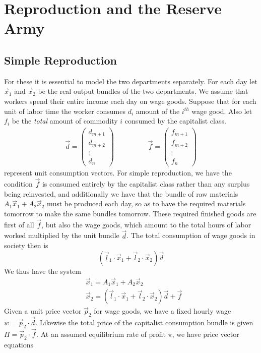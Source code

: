 \section{Reproduction and the Reserve Army}
\subsection{Simple Reproduction}
For these it is essential to model the two departments separately. For each day let $\vec{x}_1$ and $\vec{x}_2$ be the real output bundles of the two departments. We assume that workers spend their entire income each day on wage goods. Suppose that for each unit of labor time the worker consumes $d_i$ amount of the $i^{th}$ wage good. Also let $f_i$ be the \emph{total} amount of commodity $i$ consumed by the capitalist class. 
\begin{align}
	\vec{d} = \begin{pmatrix} d_{m+1} \\ d_{m+2} \\ \vdots \\ d_n \end{pmatrix} \hspace{2cm} \vec{f} = \begin{pmatrix} f_{m+1} \\ f_{m+2} \\ \vdots \\ f_n \end{pmatrix}
\end{align}
represent unit consumption vectors. For simple reproduction, we have the condition $\vec{f}$ is consumed entirely by the capitalist class rather than any surplus being reinvested, and additionally we have that the bundle of raw materials $A_1\vec{x}_1 + A_2\vec{x}_2$ must be produced each day, so as to have the required materials tomorrow to make the same bundles tomorrow. These required finished goods are first of all $\vec{f}$, but also the wage goods, which amount to the total hours of labor worked multiplied by the unit bundle $\vec{d}$. The total consumption of wage goods in society then is 
\[ (\vec{l}_1\cdot \vec{x}_1 + \vec{l}_2 \cdot \vec{x}_2) \vec{d} \]
We thus have the system
\begin{align}
	& \vec{x}_1 = A_1 \vec{x}_1 + A_2 \vec{x}_2 \\
	& \vec{x}_2 = (\vec{l}_1\cdot \vec{x}_1 + \vec{l}_2 \cdot \vec{x}_2) \vec{d} + \vec{f} 
\end{align}
Given a unit price vector $\vec{p}_2$ for wage goods, we have a fixed hourly wage $w  =\vec{p}_2 \cdot \vec{d}$. Likewise the total price of the capitalist consumption bundle is given $\Pi = \vec{p}_2 \cdot \vec{f}$. At an assumed equilibrium rate of profit $\pi$, we have price vector equations
